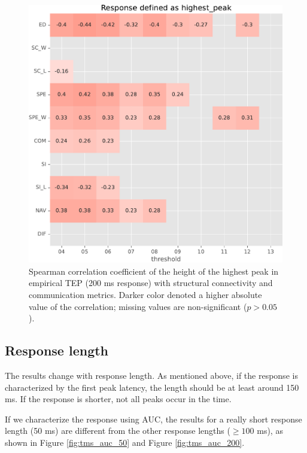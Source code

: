 \begin{figure}
    \centering
    \includegraphics[width=\textwidth]{images/nootebook_generated/tmseeg_results/empirical/200/not_over_threshold_nan/Response defined as highest_peak.pdf}
    \caption[TEPs highest peak (200 ms) correlations]{Spearman correlation coefficient of the height of the highest peak in empirical TEP (200 ms response) with structural connectivity and communication metrics. Darker color denoted a higher absolute value of the correlation; missing values are non-significant ($p>0.05$).}
    \label{fig:tms_heighest_200}
\end{figure}

\subsection{Response length}

The results change with response length. As mentioned above, if the response is characterized by the first peak latency, the length should be at least around 150 ms. If the response is shorter, not all peaks occur in the time. 

If we characterize the response using AUC, the results for a really short response length (50 ms) are different from the other response lengths ($\geq100$ ms), as shown in Figure \ref{fig:tms_auc_50} and Figure \ref{fig:tms_auc_200}.

